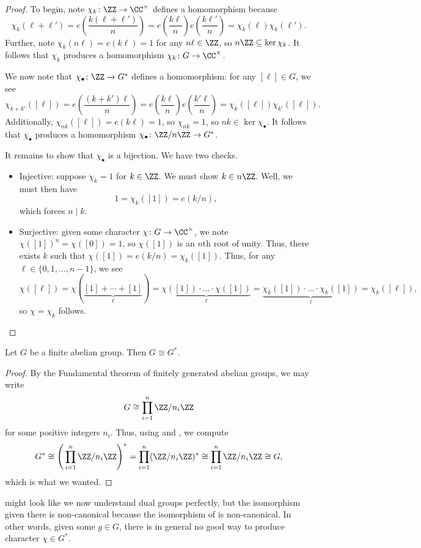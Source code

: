 \documentclass[../notes.tex]{subfiles}
\begin{document}
\begin{proof}
	To begin, note $\chi_k\colon\ZZ\to\CC^\times$ defines a homomorphism because
	\[\chi_k(\ell+\ell')=e\left(\frac{k(\ell+\ell')}n\right)=e\left(\frac{k\ell}n\right)e\left(\frac{k\ell'}n\right)=\chi_k(\ell)\chi_k(\ell').\]
	Further, note $\chi_k(n\ell)=e(k\ell)=1$ for any $n\ell\in\ZZ$, so $n\ZZ\subseteq\ker\chi_k$. It follows that $\chi_k$ produces a homomorphism $\chi_k\colon G\to\CC^\times$.

	We now note that $\chi_\bullet\colon\ZZ\to G^*$ defines a homomorphism: for any $[\ell]\in G$, we see
	\[\chi_{k+k'}([\ell])=e\left(\frac{(k+k')\ell}n\right)=e\left(\frac{k\ell}n\right)e\left(\frac{k'\ell}n\right)=\chi_k([\ell])\chi_{k'}([\ell]).\]
	Additionally, $\chi_{nk}([\ell])=e(k\ell)=1$, so $\chi_{nk}=1$, so $nk\in\ker\chi_\bullet$. It follows that $\chi_\bullet$ produces a homomorphism $\chi_\bullet\colon\ZZ/n\ZZ\to G^*$.

	It remains to show that $\chi_\bullet$ is a bijection. We have two checks.
	\begin{itemize}
		\item Injective: suppose $\chi_k=1$ for $k\in\ZZ$. We must show $k\in n\ZZ$. Well, we must then have
		\[1=\chi_k([1])=e(k/n),\]
		which forces $n\mid k$.
		\item Surjective: given some character $\chi\colon G\to\CC^\times$, we note $\chi([1])^n=\chi([0])=1$, so $\chi([1])$ is an $n$th root of unity. Thus, there exists $k$ such that $\chi([1])=e(k/n)=\chi_k([1])$. Thus, for any $\ell\in\{0,1,\ldots,n-1\}$, we see
		\[\chi([\ell])=\chi(\underbrace{[1]+\cdots+[1]}_\ell)=\underbrace{\chi([1])\cdot\ldots\cdot\chi([1])}_\ell=\underbrace{\chi_k([1])\cdot\ldots\cdot\chi_k([1])}_\ell=\chi_k([\ell]),\]
		so $\chi=\chi_k$ follows.
		\qedhere
	\end{itemize}
\end{proof}
\begin{proposition} \label{prop:g-cong-g-dual}
	Let $G$ be a finite abelian group. Then $G\cong G^*$.
\end{proposition}
\begin{proof}
	By the Fundamental theorem of finitely generated abelian groups, we may write
	\[G\cong\prod_{i=1}^n\ZZ/n_i\ZZ\]
	for some positive integers $n_i$. Thus, using  and , we compute
	\[G^*\cong\Bigg(\prod_{i=1}^n\ZZ/n_i\ZZ\Bigg)^*=\prod_{i=1}^n(\ZZ/n_i\ZZ)^*\cong\prod_{i=1}^n\ZZ/n_i\ZZ\cong G,\]
	which is what we wanted.
\end{proof}
 might look like we now understand dual groups perfectly, but the isomorphism given there is non-canonical because the isomorphism of  is non-canonical. In other words, given some $g\in G$, there is in general no good way to produce character $\chi\in G^*$.
\end{document}
